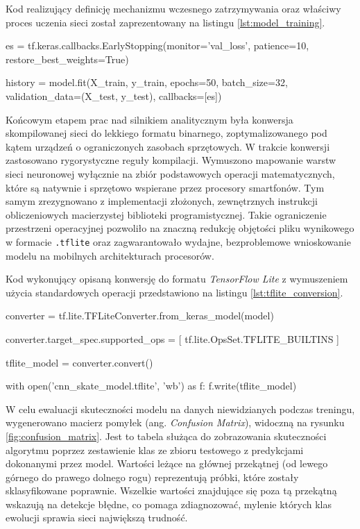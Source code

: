         Kod realizujący definicję mechanizmu wczesnego zatrzymywania oraz właściwy proces uczenia sieci został zaprezentowany na listingu \ref{lst:model_training}.

        \begin{code}[
    language=Python,
    caption={Konfiguracja procesu uczenia i mechanizmu wczesnego zatrzymywania.},
    label={lst:model_training}
]
es = tf.keras.callbacks.EarlyStopping(monitor='val_loss', 
patience=10, restore_best_weights=True)

history = model.fit(X_train, y_train, epochs=50, batch_size=32,
validation_data=(X_test, y_test), callbacks=[es])
\end{code}

        Końcowym etapem prac nad silnikiem analitycznym była konwersja skompilowanej sieci do lekkiego formatu binarnego, zoptymalizowanego pod kątem urządzeń o ograniczonych zasobach sprzętowych. W trakcie konwersji zastosowano rygorystyczne reguły kompilacji. Wymuszono mapowanie warstw sieci neuronowej wyłącznie na zbiór podstawowych operacji matematycznych, które są natywnie i sprzętowo wspierane przez procesory smartfonów. Tym samym zrezygnowano z implementacji złożonych, zewnętrznych instrukcji obliczeniowych macierzystej biblioteki programistycznej. Takie ograniczenie przestrzeni operacyjnej pozwoliło na znaczną redukcję objętości pliku wynikowego w formacie \texttt{.tflite} oraz zagwarantowało wydajne, bezproblemowe wnioskowanie modelu na mobilnych architekturach procesorów.

        Kod wykonujący opisaną konwersję do formatu \textit{TensorFlow Lite} z wymuszeniem użycia standardowych operacji przedstawiono na listingu \ref{lst:tflite_conversion}.

\begin{code}[
    language=Python,
    caption={Konwersja modelu do zoptymalizowanego formatu TensorFlow Lite.},
    label={lst:tflite_conversion}
]
converter = tf.lite.TFLiteConverter.from_keras_model(model)

converter.target_spec.supported_ops = [
  tf.lite.OpsSet.TFLITE_BUILTINS
]

tflite_model = converter.convert()

with open('cnn_skate_model.tflite', 'wb') as f:
    f.write(tflite_model)
\end{code}

W celu ewaluacji skuteczności modelu na danych niewidzianych podczas treningu, wygenerowano macierz pomyłek (ang. \textit{Confusion Matrix}), widoczną na rysunku \ref{fig:confusion_matrix}. Jest to tabela służąca do zobrazowania skuteczności algorytmu poprzez zestawienie klas ze zbioru testowego z predykcjami dokonanymi przez model. Wartości leżące na głównej przekątnej (od lewego górnego do prawego dolnego rogu) reprezentują próbki, które zostały sklasyfikowane poprawnie. Wszelkie wartości znajdujące się poza tą przekątną wskazują na detekcje błędne, co pomaga zdiagnozować, mylenie których klas ewolucji sprawia sieci największą trudność.

